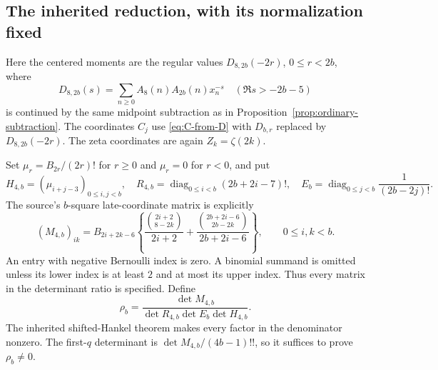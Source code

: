 \documentclass[11pt,letterpaper]{article}
\theoremstyle{definition}
\theoremstyle{remark}
\numberwithin{equation}{section}
\begin{document}
\subsection{The inherited reduction, with its normalization fixed}

Here the centered moments are the regular values
$D_{8,2b}(-2r)$, $0\le r<2b$, where
\[
 D_{8,2b}(s)=\sum_{n\ge0}A_8(n)A_{2b}(n)x_n^{-s}
 \quad(\Re s>-2b-5)
\]
is continued by the same midpoint subtraction as in
Proposition~\ref{prop:ordinary-subtraction}. The coordinates $C_j$
use \eqref{eq:C-from-D} with $D_{b,r}$ replaced by $D_{8,2b}(-2r)$.
The zeta coordinates are again $Z_k=\zeta(2k)$.

Set $\mu_r=B_{2r}/(2r)!$ for $r\ge0$ and $\mu_r=0$ for $r<0$,
and put
\[
 H_{4,b}=(\mu_{i+j-3})_{0\le i,j<b},\quad
 R_{4,b}=\operatorname{diag}_{0\le i<b}(2b+2i-7)!,\quad
 E_b=\operatorname{diag}_{0\le j<b}\frac1{(2b-2j)!}.
\]
The source's $b$-square late-coordinate matrix is explicitly
\begin{equation}\label{rank8:source-matrix}
 (M_{4,b})_{ik}=B_{2i+2k-6}
 \left\{\frac{\binom{2i+2}{8-2k}}{2i+2}
       +\frac{\binom{2b+2i-6}{2b-2k}}{2b+2i-6}\right\},
 \qquad 0\le i,k<b.
\end{equation}
An entry with negative Bernoulli index is zero. A binomial summand is
omitted unless its lower index is at least $2$ and at most its upper
index. Thus every matrix in the determinant ratio is specified. Define
\begin{equation}\label{rank8:rho}
 \rho_b=\frac{\det M_{4,b}}
 {\det R_{4,b}\det E_b\det H_{4,b}}.
\end{equation}
The inherited shifted-Hankel theorem makes every factor in the
denominator nonzero.  The first-$q$ determinant is
$\det M_{4,b}/(4b-1)!!$, so it suffices to prove $\rho_b\ne0$.
\end{document}
